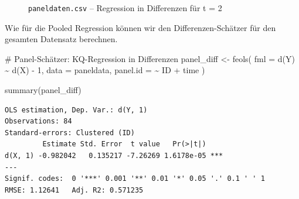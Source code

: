 \documentclass[
  a4paper,
  DIV=11,
  oneside]{scrreprt}
\newenvironment{Shaded}{\begin{snugshade}}{\end{snugshade}}
\newcommand{\AttributeTok}[1]{\textcolor[rgb]{0.40,0.45,0.13}{#1}}
\newcommand{\CommentTok}[1]{\textcolor[rgb]{0.37,0.37,0.37}{#1}}
\newcommand{\DecValTok}[1]{\textcolor[rgb]{0.68,0.00,0.00}{#1}}
\newcommand{\FunctionTok}[1]{\textcolor[rgb]{0.28,0.35,0.67}{#1}}
\newcommand{\NormalTok}[1]{\textcolor[rgb]{0.00,0.23,0.31}{#1}}
\newcommand{\OtherTok}[1]{\textcolor[rgb]{0.00,0.23,0.31}{#1}}
\newcommand{\SpecialCharTok}[1]{\textcolor[rgb]{0.37,0.37,0.37}{#1}}
\begin{document}
\begin{figure}[t]


\caption{\label{fig-diffregression1}\texttt{paneldaten.csv} --
Regression in Differenzen für t = 2}

\end{figure}%

Wie für die Pooled Regression können wir den Differenzen-Schätzer für
den gesamten Datensatz berechnen.

\begin{Shaded}
\begin{Highlighting}[]
\CommentTok{\# Panel{-}Schätzer: KQ{-}Regression in Differenzen}
\NormalTok{panel\_diff }\OtherTok{\textless{}{-}} \FunctionTok{feols}\NormalTok{(}
  \AttributeTok{fml =} \FunctionTok{d}\NormalTok{(Y) }\SpecialCharTok{\textasciitilde{}} \FunctionTok{d}\NormalTok{(X) }\SpecialCharTok{{-}} \DecValTok{1}\NormalTok{, }
  \AttributeTok{data =}\NormalTok{ paneldata,}
  \AttributeTok{panel.id =} \SpecialCharTok{\textasciitilde{}}\NormalTok{ ID }\SpecialCharTok{+}\NormalTok{ time}
\NormalTok{)}

\FunctionTok{summary}\NormalTok{(panel\_diff)}
\end{Highlighting}
\end{Shaded}

\begin{verbatim}
OLS estimation, Dep. Var.: d(Y, 1)
Observations: 84
Standard-errors: Clustered (ID) 
         Estimate Std. Error  t value   Pr(>|t|)    
d(X, 1) -0.982042   0.135217 -7.26269 1.6178e-05 ***
---
Signif. codes:  0 '***' 0.001 '**' 0.01 '*' 0.05 '.' 0.1 ' ' 1
RMSE: 1.12641   Adj. R2: 0.571235
\end{verbatim}
\end{document}
